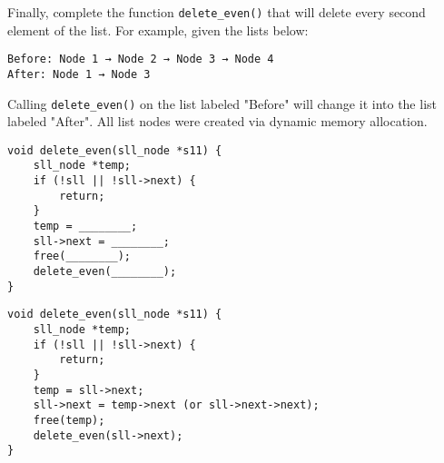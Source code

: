 \begin{blocksection}
Finally, complete the function \lstinline$delete_even()$ that will delete every second element of the list. For example, given the lists below:

\begin{verbatim}
Before: Node 1 → Node 2 → Node 3 → Node 4 
After: Node 1 → Node 3
\end{verbatim}

Calling \lstinline$delete_even()$ on the list labeled "Before" will change it into the list labeled "After". All list nodes were created via dynamic memory allocation.

\begin{verbatim}
void delete_even(sll_node *s11) {
    sll_node *temp; 
    if (!sll || !sll->next) {
        return;
    }
    temp = ________; 
    sll->next = ________;
    free(________); 
    delete_even(________);
}
\end{verbatim}

\begin{solution}
\begin{verbatim}
void delete_even(sll_node *s11) {
    sll_node *temp; 
    if (!sll || !sll->next) {
        return;
    }
    temp = sll->next; 
    sll->next = temp->next (or sll->next->next);
    free(temp); 
    delete_even(sll->next);
}
\end{verbatim}
\end{solution}

\end{blocksection}